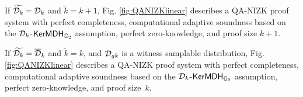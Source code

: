 \begin{theorem} If $\widetilde{\mathcal{D}_{k}}=\mathcal{D}_k$ and $\tilde{k}=k+1$,  Fig. \ref{fig:QANIZKlinear} describes a QA-NIZK
proof system with perfect completeness, computational adaptive soundness based on the  $\mathcal{D}_{k}$-$\mathsf{KerMDH}{}_{\mathbb{G}_2}$ assumption, perfect zero-knowledge, and proof size $k+1$. 
\label{theo:qanizk1}
\end{theorem}

\begin{theorem} If $\widetilde{\mathcal{D}_{k}}=\overline{\mathcal{D}}_k$ and $\tilde{k}=k$,  and $\mathcal{D}_{gk}$ is a witness samplable distribution, Fig. \ref{fig:QANIZKlinear} describes a QA-NIZK
proof system with perfect completeness, computational adaptive soundness based on the  $\mathcal{D}_{k}$-$\mathsf{KerMDH}{}_{\mathbb{G}_2}$ assumption, perfect zero-knowledge, and proof size~$k$. 
\label{theo:qanizk2}
\end{theorem}
